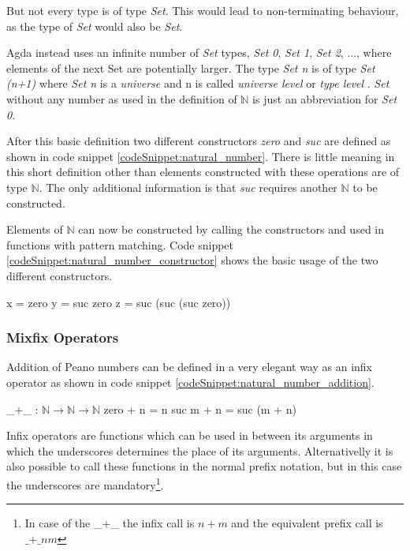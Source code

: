 But not every type is of type \emph{Set}. This would lead to non-terminating behaviour, as the type of \emph{Set} would also be \emph{Set}.

Agda instead uses an infinite number of \emph{Set} types, \emph{Set 0}, \emph{Set 1}, \emph{Set 2}, ..., where elements of the next Set are potentially larger.
The type \emph{Set n} is of type \emph{Set (n+1)} where \emph{Set n} is a \emph{universe} and n is called \emph{universe level} or \emph{type level} \cite{AgdaReadTheDocs, 10.1145/2841316}.
\emph{Set} without any number as used in the definition of $\mathbb{N}$ is just an abbreviation for \emph{Set 0}.

After this basic definition two different constructors \emph{zero} and \emph{suc} are defined as shown in code snippet \ref{codeSnippet:natural_number}.
There is little meaning in this short definition other than elements constructed with these operations are of type $\mathbb{N}$.
The only additional information is that \emph{suc} requires another $\mathbb{N}$ to be constructed.

Elements of $\mathbb{N}$ can now be constructed by calling the constructors and used in functions with pattern matching. 
Code snippet \ref{codeSnippet:natural_number_constructor} shows the basic usage of the two different constructors.

\begin{codesnippet}[mathescape=true, caption={Some peano numbers}, label={codeSnippet:natural_number_constructor}]
x = zero
y = suc zero
z = suc (suc (suc zero))
\end{codesnippet}

\subsubsection{Mixfix Operators}
Addition of Peano numbers can be defined in a very elegant way as an infix operator as shown in code snippet \ref{codeSnippet:natural_number_addition}.

\begin{codesnippet}[mathescape=true, caption={Peano numbers addition}, label={codeSnippet:natural_number_addition}]
_+_ : $\mathbb{N} \rightarrow \mathbb{N} \rightarrow \mathbb{N}$
zero  + n = n
suc m + n = suc (m + n)
\end{codesnippet}

Infix operators are functions which can be used in between its arguments in which the underscores determines the place of its arguments.
Alternativelly it is also possible to call these functions in the normal prefix notation, but in this case the underscores are mandatory\footnote{In case of the \_+\_ the infix call is $n + m$ and the equivalent prefix call is $\text{\_+\_} n m$}.

